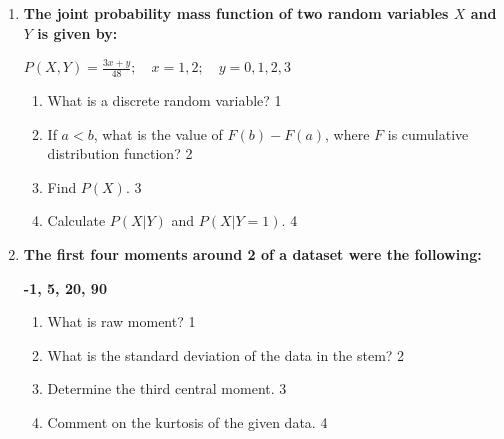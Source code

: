 \documentclass[12pt]{article}
\begin{document}
\begin{enumerate}
\begin{enumerate}
    \item What is correlation? \hfill 1
    \item Make a scatter plot from the given data and propose the association of the variables. \hfill 2
    \item
    Find and interpret the correlation coefficient. \hfill 3
    
    \item
    Fit the regression line and predict the monthly sales when advertising expenditure is \$9,000. \hfill 4
\end{enumerate}  

  \begin{center}
\textbf{Group  - B}
\end{center}

  \item
  \textbf{The joint probability mass function of two random variables \( X \) and \( Y \) is given by:}
  
  \begin{center}
  \( \displaystyle P(X,Y) = \frac{3x + y}{48}; \quad x = 1, 2; \quad y = 0, 1, 2, 3 \)
  \end{center}
 
  \begin{enumerate}
    \item What is a discrete random variable? \hfill 1
    \item If $a<b$, what is the value of $F(b) - F(a)$, where $F$ is cumulative distribution function? \hfill 2
    \item
    	Find \( P(X) \). \hfill 3
    \item
     	Calculate \( P(X \vert Y) \) and \( P(X \vert Y=1) \). \hfill 4
  \end{enumerate}

   \item
	  \textbf{The first four moments around 2 of a dataset were the following:}
	  
	  \begin{center}
	  \textbf{-1, 5, 20, 90}
	  \end{center}
  
  \begin{enumerate}
    \item
	What is raw moment? \hfill 1
    \item
	What is the standard deviation of the data in the stem? \hfill 2
    \item  
	Determine the third central moment. \hfill 3
    \item
	Comment on the kurtosis of the given data. \hfill 4
  \end{enumerate}


\end{enumerate}
\end{document}
